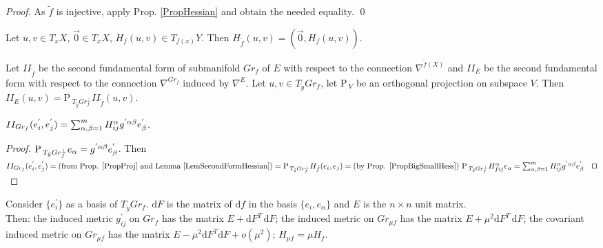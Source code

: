 \documentclass{llncs}
\newcommand{\Proj}{\mathrm{P}{\,}}
\newcommand{\CovariantDiffManif}[1]{\nabla^{#1}}
\newcommand{\Diff}{\mathrm{d}}
\begin{document}
\begin{proof}
As $\tilde{f}$ is injective, apply Prop. \ref{PropHessian} and obtain the needed equality. \textrm{\qed}
\end{proof}

\begin{proposition} \label{PropBigSmallHess}
Let $u, v \in T_xX$, $\vec{0} \in T_xX$, $H_f(u, v) \in T_{f(x)}Y$.
Then $H_{\tilde{f}}(u, v) = (\vec{0}, H_f(u, v))$.
\end{proposition}

\begin{proposition} \label{PropProj}
Let $II_{\tilde{f}}$ be the second fundamental form of submanifold $Gr_f$ of $E$ with respect to the connection $\CovariantDiffManif{\tilde{f}(X)}$ and $II_E$ be the second fundamental form with respect to the connection $\CovariantDiffManif{Gr_f}$ induced by $\CovariantDiffManif{E}$. 
Let $u, v \in T_{\tilde{y}}Gr_f$, let $\Proj_V$ be an orthogonal projection on subspace $V$. Then $II_E(u, v) = \Proj_{T_{\tilde{y}}Gr_f^{\bot}} II_{\tilde{f}}(u, v)$.
\end{proposition}

\begin{lemma} \label{LemSecondHessianFormula}
$II_{Gr_f}(e_i^{'}, e_j^{'})=\sum_{\alpha, \beta=1}^{m} \tensor*{H}{^{\alpha}_i_j} \tensor*{g}{^{'}^{\alpha}^{\beta}} e_{\beta}^{'}$.
\end{lemma}

\begin{proof}
$\Proj_{T_{\tilde{y}}Gr_f^{\bot}}e_{\alpha} = \tensor*{g}{^{'}^{\alpha}^{\beta}} e_{\beta}^{'}$. Then 
$
II_{Gr_f}(e_i^{'}, e_j^{'}) = \textrm{(from Prop. \ref{PropProj} and Lemma \ref{LemSecondFormHessian})} 
\\
=\Proj_{T_{\tilde{y}}Gr_f^{\bot}} H_{\tilde{f}}(e_i, e_j)
=\textrm{(by Prop. \ref{PropBigSmallHess}) } \Proj_{T_{\tilde{y}}Gr_f^{\bot}} \tensor*{H}{^{\alpha}_f_i_j}e_{\alpha} 
= \sum_{\alpha, \beta=1}^{m} \tensor*{H}{^{\alpha}_i_j} \tensor*{g}{^{'}^{\alpha}^{\beta}} e_{\beta}^{'}
\textrm{\qed}
$
\end{proof}

\begin{proposition} \label{PropScaled}
Consider $\{ e_i^{'} \}$ as a basis of $T_{\tilde{y}}Gr_f$. 
$\Diff F$ is the matrix of $\Diff f$ in the basis $\{ e_i, e_{\alpha} \}$ and $E$ is the $n\times n$ unit matrix.
\\
Then:
the induced metric $g^{'}_{ij}$ on $Gr_f$ has the matrix $E + \Diff F^{T} \, \Diff F $;
the induced metric on $Gr_{\mu f}$ has the matrix $E + \mu^{2} \Diff F^{T} \, \Diff F$;
the covariant induced metric on $Gr_{\mu f}$ has the matrix $E - \mu^{2} \Diff F^{T} \Diff F + o(\mu ^ {2})$;
$H_{\mu f} = \mu H_f.$
\end{proposition}
\end{document}
